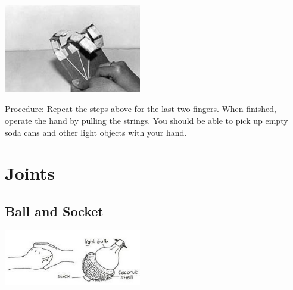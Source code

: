 \begin{multicols}{2}
\begin{center}
\includegraphics[width=0.45\textwidth]{./img/robotic-hand-final.jpg}
\end{center}

\begin{description*}
\item[Procedure:]{Repeat the steps above for the last two fingers. When finished, operate the hand by pulling the strings. You should be able to pick up empty soda cans and other light objects with your hand.}
\end{description*}


\section*{Joints} 


\subsection{Ball and Socket}

\begin{center}
\includegraphics[width=0.45\textwidth]{./img/vso/ball-socket.jpg}
\end{center}


\end{multicols}
